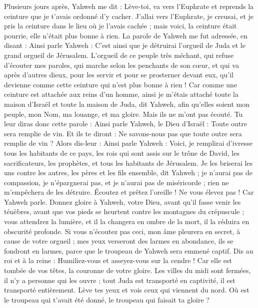 \begin{multicols}{2}
Plusieurs jours après, Yahweh me dit : Lève-toi, va vers l'Euphrate et reprends la ceinture que je t'avais ordonné d'y cacher.
J’allai vers l'Euphrate, je creusai, et je pris la ceinture dans le lieu où je l'avais cachée ; mais voici, la ceinture était pourrie, elle n'était plus bonne à rien.
La parole de Yahweh me fut adressée, en disant :
Ainsi parle Yahweh : C’est ainsi que je détruirai l'orgueil de Juda et le grand orgueil de Jérusalem.
L'orgueil de ce peuple très méchant, qui refuse d'écouter mes paroles, qui marche selon les penchants de son cœur, et qui va après d'autres dieux, pour les servir et pour se prosterner devant eux, qu’il devienne comme cette ceinture qui n'est plus bonne à rien !
Car comme une ceinture est attachée aux reins d'un homme, ainsi je m'étais attaché toute la maison d'Israël et toute la maison de Juda, dit Yahweh, afin qu'elles soient mon peuple, mon Nom, ma louange, et ma gloire. Mais ils ne m'ont pas écouté.
Tu leur diras donc cette parole : Ainsi parle Yahweh, le Dieu d'Israël : Toute outre sera remplie de vin. Et ils te diront : Ne savons-nous pas que toute outre sera remplie de vin ?
Alors dis-leur : Ainsi parle Yahweh : Voici, je remplirai d'ivresse tous les habitants de ce pays, les rois qui sont assis sur le trône de David, les sacrificateurs, les prophètes, et tous les habitants de Jérusalem.
Je les briserai les uns contre les autres, les pères et les fils ensemble, dit Yahweh ; je n'aurai pas de compassion, je n’épargnerai pas, et je n’aurai pas de miséricorde ; rien ne m’empêchera de les détruire.
Écoutez et prêtez l'oreille ! Ne vous élevez pas ! Car Yahweh parle.
Donnez gloire à Yahweh, votre Dieu, avant qu'il fasse venir les ténèbres, avant que vos pieds se heurtent contre les montagnes du crépuscule ; vous attendrez la lumière, et il la changera en ombre de la mort, il la réduira en obscurité profonde.
Si vous n'écoutez pas ceci, mon âme pleurera en secret, à cause de votre orgueil ; mes yeux verseront des larmes en abondance, ils se fondront en larmes, parce que le troupeau de Yahweh sera emmené captif.
Dis au roi et à la reine : Humiliez-vous et asseyez-vous sur la cendre ! Car elle est tombée de vos têtes, la couronne de votre gloire.
Les villes du midi sont fermées, il n'y a personne qui les ouvre ; tout Juda est transporté en captivité, il est transporté entièrement.
Lève tes yeux et vois ceux qui viennent du nord. Où est le troupeau qui t'avait été donné, le troupeau qui faisait ta gloire ?

\end{multicols}
